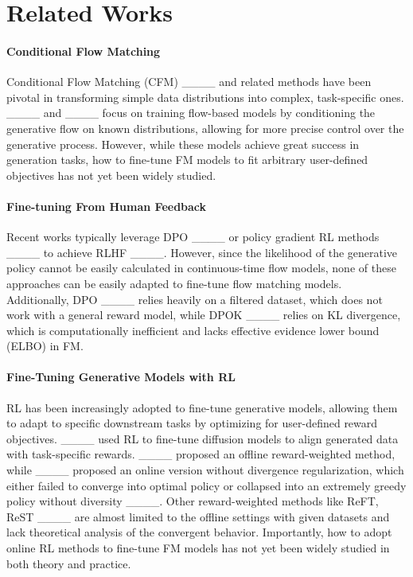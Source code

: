 \section{Related Works}
\paragraph{Conditional Flow Matching} Conditional Flow Matching (CFM) ____ and related methods have been pivotal in transforming simple data distributions into complex, task-specific ones. ____ and ____ focus on training flow-based models by conditioning the generative flow on known distributions, allowing for more precise control over the generative process. However, while these models achieve great success in generation tasks, how to fine-tune FM models to fit arbitrary user-defined objectives has not yet been widely studied.



\paragraph{Fine-tuning From Human Feedback} Recent works typically leverage DPO ____ or policy gradient RL methods ____ to achieve RLHF ____. However, since the likelihood of the generative policy cannot be easily calculated in continuous-time flow models, none of these approaches can be easily adapted to fine-tune flow matching models. Additionally, DPO ____ relies heavily on a filtered dataset, which does not work with a general reward model, while DPOK ____ relies on KL divergence, which is computationally inefficient and lacks effective evidence lower bound (ELBO) in FM.


\paragraph{Fine-Tuning Generative Models with RL}
RL has been increasingly adopted to fine-tune generative models, allowing them to adapt to specific downstream tasks by optimizing for user-defined reward objectives. ____ used RL to fine-tune diffusion models to align generated data with task-specific rewards. ____ proposed an offline reward-weighted method,  while ____ proposed an online version without divergence regularization, which either failed to converge into optimal policy  or collapsed into an extremely greedy policy without diversity ____. Other reward-weighted methods like ReFT, ReST ____ are almost  limited to the offline settings with given datasets and lack theoretical analysis of the convergent behavior.  Importantly, how to adopt online RL methods to fine-tune FM models has not yet been widely studied in both theory and practice.
